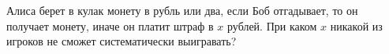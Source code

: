 Алиса берет в кулак монету в рубль или два, если Боб отгадывает, то он получает монету, иначе он платит штраф в $x$
рублей. При каком $x$ никакой из игроков не сможет систематически выигравать?